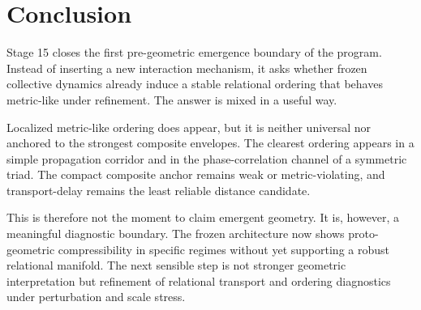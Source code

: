 \documentclass[11pt]{article}
\begin{document}
\section{Conclusion}

Stage 15 closes the first pre-geometric emergence boundary of the program. Instead of inserting a new interaction mechanism, it asks whether frozen collective dynamics already induce a stable relational ordering that behaves metric-like under refinement. The answer is mixed in a useful way.

Localized metric-like ordering does appear, but it is neither universal nor anchored to the strongest composite envelopes. The clearest ordering appears in a simple propagation corridor and in the phase-correlation channel of a symmetric triad. The compact composite anchor remains weak or metric-violating, and transport-delay remains the least reliable distance candidate.

This is therefore not the moment to claim emergent geometry. It is, however, a meaningful diagnostic boundary. The frozen architecture now shows proto-geometric compressibility in specific regimes without yet supporting a robust relational manifold. The next sensible step is not stronger geometric interpretation but refinement of relational transport and ordering diagnostics under perturbation and scale stress.
\end{document}
